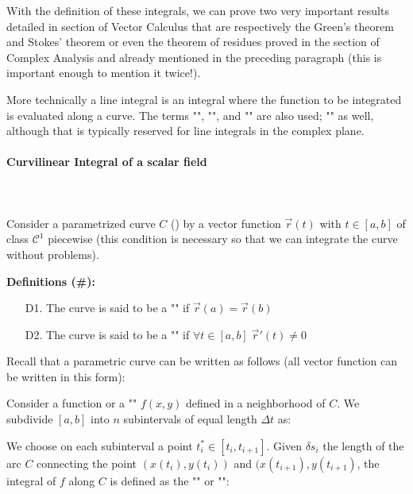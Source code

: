 	With the definition of these integrals, we can prove two very important results detailed in section of Vector Calculus that are respectively the Green's theorem and Stokes' theorem or even the theorem of residues proved in the section of Complex Analysis and already mentioned in the preceding paragraph (this is important enough to mention it twice!).
	
	More technically a line integral is an integral where the function to be integrated is evaluated along a curve. The terms "", "", and "" are also used; "" as well, although that is typically reserved for line integrals in the complex plane.
	
	\paragraph{Curvilinear Integral of a scalar field}\mbox{}\\\\
	Consider a parametrized curve $C$ () by a vector function $\vec{r}(t)$ with $t \in [a,b]$ of class $\mathcal{C}^1$ piecewise (this condition is necessary so that we can integrate the curve without problems).
	
	\textbf{Definitions (\#\mydef):}
	 \begin{enumerate}
	 	\item[D1.] The curve is said to be a "" if $\vec{r}(a)=\vec{r}(b)$
	 	
	 	\item[D2.] The curve is said to be a "" if $\forall t \in [a,b]\; \vec{r}'(t)\neq 0$
	 \end{enumerate}
	 Recall that a parametric curve can be written as follows (all vector function can be written in this form):
	 
	Consider a function or a "" $f(x,y)$ defined in a neighborhood of $C$. We subdivide $[a,b]$ into $n$ subintervals of equal length $\Delta t$ as:
	
	We choose on each subinterval a point $t_i^*\in [t_i,t_{i+1}]$. Given $\delta s_i$ the length of the arc $C$ connecting the point $(x(t_i),y(t_i))$ and $(x(t_{i+1}),y(t_{i+1})$, the integral of $f$ along $C$ is defined as the "" or "":
	
